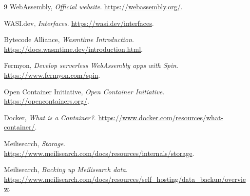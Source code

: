 \documentclass[11pt,a4paper]{article}
\begin{document}
\begin{thebibliography}{9}
WebAssembly, \textit{Official website}. \url{https://webassembly.org/}.

WASI.dev, \textit{Interfaces}. \url{https://wasi.dev/interfaces}.

Bytecode Alliance, \textit{Wasmtime Introduction}. \url{https://docs.wasmtime.dev/introduction.html}.

Fermyon, \textit{Develop serverless WebAssembly apps with Spin}. \url{https://www.fermyon.com/spin}.

Open Container Initiative, \textit{Open Container Initiative}. \url{https://opencontainers.org/}.

Docker, \textit{What is a Container?}. \url{https://www.docker.com/resources/what-container/}.

Meilisearch, \textit{Storage}. \url{https://www.meilisearch.com/docs/resources/internals/storage}.

Meilisearch, \textit{Backing up Meilisearch data}. \url{https://www.meilisearch.com/docs/resources/self_hosting/data_backup/overview}.
\end{thebibliography}
\end{document}
